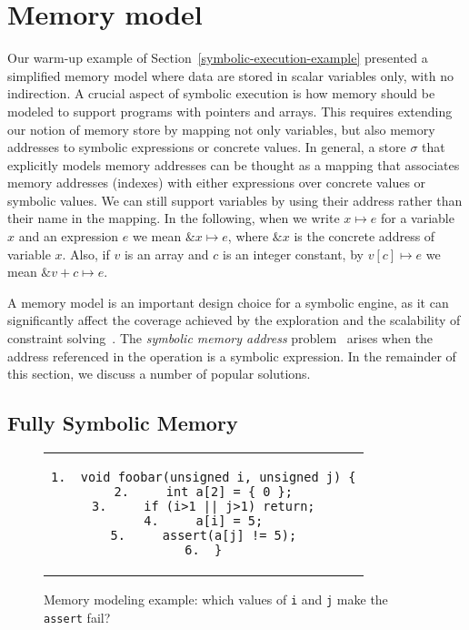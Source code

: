 

\section{Memory model}
\label{memory-model}

Our warm-up example of Section~\ref{symbolic-execution-example} presented a simplified memory model where data are stored in scalar variables only, with no indirection. A crucial aspect of symbolic execution is how memory should be modeled to support programs with pointers and arrays. This requires extending our notion of memory store by mapping not only variables, but also memory addresses to symbolic expressions or concrete values. In general, a store $\sigma$ that explicitly models memory addresses can be thought as a mapping that associates memory addresses (indexes) with either expressions over concrete values or symbolic values. We can still support variables by using their address rather than their name in the mapping. In the following, when we write $x\mapsto e$ for a variable $x$ and an expression $e$ we mean $\&x\mapsto e$, where $\&x$ is the concrete address of variable $x$. Also, if $v$ is an array and $c$ is an integer constant, by $v[c]\mapsto e$ we mean $\&v+c\mapsto e$.

A memory model is an important design choice for a symbolic engine, as it can significantly affect the coverage achieved by the exploration and the scalability of constraint solving~\cite{CS-CACM13}.
%
The {\em symbolic memory address} problem~\cite{SAB-SP10} arises when the address referenced in the operation is a symbolic expression. In the remainder of this section, we discuss a number of popular solutions.

\subsection{Fully Symbolic Memory}
\label{ss:fully-symbolic-memory}

\begin{figure}[t]
\begin{center}
\begin{tabular}{c}
\begin{lstlisting}[basicstyle=\ttfamily\scriptsize]
1.  void foobar(unsigned i, unsigned j) {
2.     int a[2] = { 0 };
3.     if (i>1 || j>1) return;
4.     a[i] = 5;
5.     assert(a[j] != 5);
6.  }
\end{lstlisting}
\end{tabular}
\end{center}
\vspace{-2mm}
\caption{Memory modeling example: which values of \texttt{i} and \texttt{j} make the \texttt{assert} fail?}
\label{fi:example-mem}
\end{figure}

